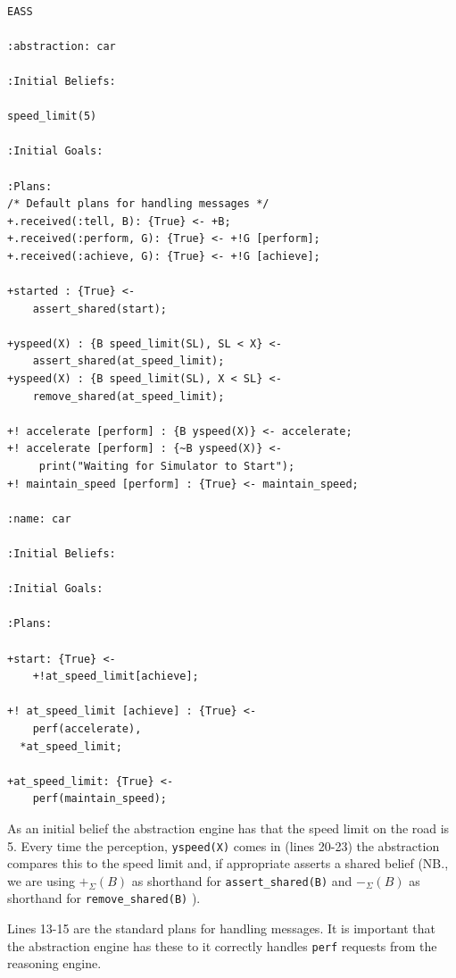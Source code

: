 \begin{ourexample}
\label{code:EASSexample} \quad \\
\begin{lstlisting}[basicstyle=\sffamily,style=easslisting,language=Gwendolen]
EASS

:abstraction: car

:Initial Beliefs:

speed_limit(5)
											
:Initial Goals:
		
:Plans: 
/* Default plans for handling messages */
+.received(:tell, B): {True} <- +B;   
+.received(:perform, G): {True} <- +!G [perform];
+.received(:achieve, G): {True} <- +!G [achieve];

+started : {True} <-
	assert_shared(start);

+yspeed(X) : {B speed_limit(SL), SL < X} <-
	assert_shared(at_speed_limit);
+yspeed(X) : {B speed_limit(SL), X < SL} <-
	remove_shared(at_speed_limit);
	
+! accelerate [perform] : {B yspeed(X)} <- accelerate;
+! accelerate [perform] : {~B yspeed(X)} <- 
     print("Waiting for Simulator to Start");
+! maintain_speed [perform] : {True} <- maintain_speed;

:name: car
			
:Initial Beliefs:
													
:Initial Goals:
		
:Plans: 

+start: {True} <-
	+!at_speed_limit[achieve];

+! at_speed_limit [achieve] : {True} <-
	perf(accelerate),
  *at_speed_limit;

+at_speed_limit: {True} <-
	perf(maintain_speed);
\end{lstlisting}
\end{ourexample}

As an initial belief the abstraction engine has that the speed limit on the road is 5.  Every time the perception, \lstinline{yspeed(X)} comes in (lines 20-23) the abstraction compares this to the speed limit and, if appropriate asserts a shared belief (NB., we are using $+_{\Sigma}(B)$ as shorthand for \lstinline{assert_shared(B)} and  $-_{\Sigma}(B)$ as shorthand for \lstinline{remove_shared(B)} ).

Lines 13-15 are the standard plans for handling messages.  It is important that the abstraction engine has these to it correctly handles \texttt{perf} requests from the reasoning engine.

